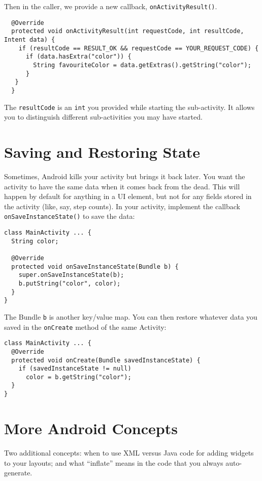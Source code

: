 Then in the caller, we provide a new callback, {\tt onActivityResult()}.

{\scriptsize
\begin{lstlisting}
  @Override
  protected void onActivityResult(int requestCode, int resultCode, Intent data) {
    if (resultCode == RESULT_OK && requestCode == YOUR_REQUEST_CODE) {
      if (data.hasExtra("color")) {
        String favouriteColor = data.getExtras().getString("color");
      }
   }
  }
\end{lstlisting}
}

The {\tt resultCode} is an {\tt int} you provided while starting the
sub-activity. It allows you to distinguish different sub-activities you
may have started.



\section*{Saving and Restoring State}
Sometimes, Android kills your activity but brings it back later. You
want the activity to have the same data when it comes back from the
dead. This will happen by default for anything in a UI element, but
not for any fields stored in the activity (like, say, step counts). In
your activity, implement the callback {\tt onSaveInstanceState()} to
save the data:

{\scriptsize
\begin{lstlisting}
class MainActivity ... {
  String color;

  @Override
  protected void onSaveInstanceState(Bundle b) {
    super.onSaveInstanceState(b);
    b.putString("color", color);
  }
}
\end{lstlisting}
}
The Bundle {\tt b} is another key/value map. You can then restore whatever
data you saved in the {\tt onCreate} method of the same Activity:
{\scriptsize
\begin{lstlisting}
class MainActivity ... {
  @Override
  protected void onCreate(Bundle savedInstanceState) {
    if (savedInstanceState != null)
      color = b.getString("color");
  }
}
\end{lstlisting}
}

\section*{More Android Concepts}
Two additional concepts: when to use XML versus Java
code for adding widgets to your layouts; and what ``inflate'' means
in the code that you always auto-generate.

